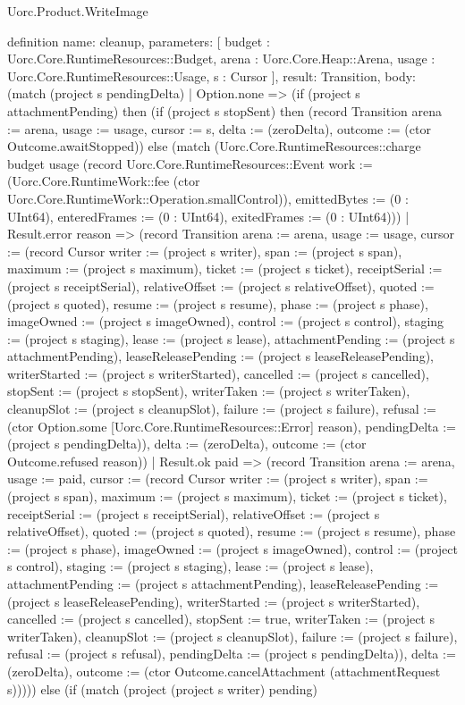 \begin{lexlean}{Uorc.Product.WriteImage}
\begin{semanticmodule}
definition{
  name: cleanup,
  parameters: [
    budget : Uorc.Core.RuntimeResources::Budget,
    arena : Uorc.Core.Heap::Arena,
    usage : Uorc.Core.RuntimeResources::Usage,
    s : Cursor
  ],
  result: Transition,
  body: (match (project s pendingDelta)
    | Option.none => (if (project s attachmentPending) then (if (project s stopSent) then (record Transition {arena := arena, usage := usage, cursor := s, delta := (zeroDelta), outcome := (ctor Outcome.awaitStopped)}) else (match (Uorc.Core.RuntimeResources::charge budget usage (record Uorc.Core.RuntimeResources::Event {work := (Uorc.Core.RuntimeWork::fee (ctor Uorc.Core.RuntimeWork::Operation.smallControl)), emittedBytes := (0 : UInt64), enteredFrames := (0 : UInt64), exitedFrames := (0 : UInt64)}))
      | Result.error reason => (record Transition {arena := arena, usage := usage, cursor := (record Cursor {writer := (project s writer), span := (project s span), maximum := (project s maximum), ticket := (project s ticket), receiptSerial := (project s receiptSerial), relativeOffset := (project s relativeOffset), quoted := (project s quoted), resume := (project s resume), phase := (project s phase), imageOwned := (project s imageOwned), control := (project s control), staging := (project s staging), lease := (project s lease), attachmentPending := (project s attachmentPending), leaseReleasePending := (project s leaseReleasePending), writerStarted := (project s writerStarted), cancelled := (project s cancelled), stopSent := (project s stopSent), writerTaken := (project s writerTaken), cleanupSlot := (project s cleanupSlot), failure := (project s failure), refusal := (ctor Option.some [Uorc.Core.RuntimeResources::Error] reason), pendingDelta := (project s pendingDelta)}), delta := (zeroDelta), outcome := (ctor Outcome.refused reason)})
      | Result.ok paid => (record Transition {arena := arena, usage := paid, cursor := (record Cursor {writer := (project s writer), span := (project s span), maximum := (project s maximum), ticket := (project s ticket), receiptSerial := (project s receiptSerial), relativeOffset := (project s relativeOffset), quoted := (project s quoted), resume := (project s resume), phase := (project s phase), imageOwned := (project s imageOwned), control := (project s control), staging := (project s staging), lease := (project s lease), attachmentPending := (project s attachmentPending), leaseReleasePending := (project s leaseReleasePending), writerStarted := (project s writerStarted), cancelled := (project s cancelled), stopSent := true, writerTaken := (project s writerTaken), cleanupSlot := (project s cleanupSlot), failure := (project s failure), refusal := (project s refusal), pendingDelta := (project s pendingDelta)}), delta := (zeroDelta), outcome := (ctor Outcome.cancelAttachment (attachmentRequest s))}))) else (if (match (project (project s writer) pending)
}
\end{semanticmodule}
\end{lexlean}
